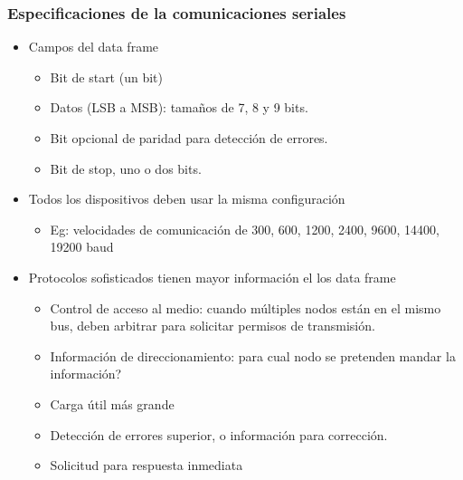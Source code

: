 \documentclass[10.5pt,scale=1.0,t,aspectratio=169,hyperref={pdfpagelabels=false}]{beamer}
\begin{document}
\begin{frame}
	\frametitle{Especificaciones de la comunicaciones seriales}
	\begin{itemize}
		\item Campos del data frame
		\begin{itemize}
			\item Bit de start (un bit)
			\item Datos (LSB a MSB): tamaños de 7, 8 y 9 bits.
			\item Bit opcional de paridad para detección de errores.
			\item Bit de stop, uno o dos bits.
		\end{itemize}
		\item Todos los dispositivos deben usar la misma configuración
		\begin{itemize}
			\item Eg: velocidades de comunicación de 300, 600, 1200, 2400, 9600, 14400, 19200 baud
		\end{itemize}
		\item Protocolos sofisticados tienen mayor información el los data frame
		\begin{itemize}
			\item Control de acceso al medio: cuando múltiples nodos están en el mismo bus, deben arbitrar para solicitar permisos de transmisión.
			\item Información de direccionamiento: para cual nodo se pretenden mandar la información?
			\item Carga útil más grande
			\item Detección de errores superior, o información para corrección.
			\item Solicitud para respuesta inmediata
		\end{itemize}
	\end{itemize}
	
\end{frame}
\end{document}
